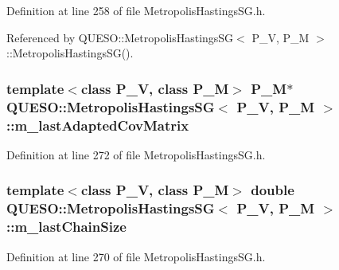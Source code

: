 Definition at line 258 of file Metropolis\-Hastings\-S\-G.\-h.



Referenced by Q\-U\-E\-S\-O\-::\-Metropolis\-Hastings\-S\-G$<$ P\-\_\-\-V, P\-\_\-\-M $>$\-::\-Metropolis\-Hastings\-S\-G().

\hypertarget{class_q_u_e_s_o_1_1_metropolis_hastings_s_g_a1c73b49339c8a1015d95a890d7882331}{
\subsubsection[{m\-\_\-last\-Adapted\-Cov\-Matrix}]{\setlength{\rightskip}{0pt plus 5cm}template$<$class P\-\_\-\-V, class P\-\_\-\-M$>$ P\-\_\-\-M$\ast$ {\bf Q\-U\-E\-S\-O\-::\-Metropolis\-Hastings\-S\-G}$<$ P\-\_\-\-V, P\-\_\-\-M $>$\-::m\-\_\-last\-Adapted\-Cov\-Matrix\hspace{0.3cm}{\ttfamily [private]}}}\label{class_q_u_e_s_o_1_1_metropolis_hastings_s_g_a1c73b49339c8a1015d95a890d7882331}


Definition at line 272 of file Metropolis\-Hastings\-S\-G.\-h.

\hypertarget{class_q_u_e_s_o_1_1_metropolis_hastings_s_g_a005d221d1c458ff767ed03304ca4cd6f}{
\subsubsection[{m\-\_\-last\-Chain\-Size}]{\setlength{\rightskip}{0pt plus 5cm}template$<$class P\-\_\-\-V, class P\-\_\-\-M$>$ double {\bf Q\-U\-E\-S\-O\-::\-Metropolis\-Hastings\-S\-G}$<$ P\-\_\-\-V, P\-\_\-\-M $>$\-::m\-\_\-last\-Chain\-Size\hspace{0.3cm}{\ttfamily [private]}}}\label{class_q_u_e_s_o_1_1_metropolis_hastings_s_g_a005d221d1c458ff767ed03304ca4cd6f}


Definition at line 270 of file Metropolis\-Hastings\-S\-G.\-h.

